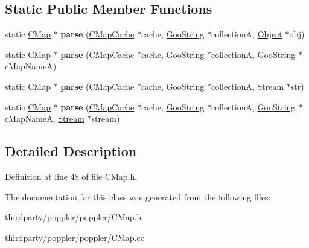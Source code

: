 \subsection*{Static Public Member Functions}
\begin{DoxyCompactItemize}
\item 
\mbox{\label{class_c_map_ab5c82634e14c98587fd3818e840735da}} 
static \hyperlink{class_c_map}{C\+Map} $\ast$ {\bfseries parse} (\hyperlink{class_c_map_cache}{C\+Map\+Cache} $\ast$cache, \hyperlink{class_goo_string}{Goo\+String} $\ast$collectionA, \hyperlink{class_object}{Object} $\ast$obj)
\item 
\mbox{\label{class_c_map_ac7fceeff37c2f559276bc9d5ce3ad06d}} 
static \hyperlink{class_c_map}{C\+Map} $\ast$ {\bfseries parse} (\hyperlink{class_c_map_cache}{C\+Map\+Cache} $\ast$cache, \hyperlink{class_goo_string}{Goo\+String} $\ast$collectionA, \hyperlink{class_goo_string}{Goo\+String} $\ast$c\+Map\+NameA)
\item 
\mbox{\label{class_c_map_ae95c49b2616ccbb821b1e48803356a6d}} 
static \hyperlink{class_c_map}{C\+Map} $\ast$ {\bfseries parse} (\hyperlink{class_c_map_cache}{C\+Map\+Cache} $\ast$cache, \hyperlink{class_goo_string}{Goo\+String} $\ast$collectionA, \hyperlink{class_stream}{Stream} $\ast$str)
\item 
\mbox{\label{class_c_map_aa4c7fd71105b7fd794bab0a26b32e082}} 
static \hyperlink{class_c_map}{C\+Map} $\ast$ {\bfseries parse} (\hyperlink{class_c_map_cache}{C\+Map\+Cache} $\ast$cache, \hyperlink{class_goo_string}{Goo\+String} $\ast$collectionA, \hyperlink{class_goo_string}{Goo\+String} $\ast$c\+Map\+NameA, \hyperlink{class_stream}{Stream} $\ast$stream)
\end{DoxyCompactItemize}


\subsection{Detailed Description}


Definition at line 48 of file C\+Map.\+h.



The documentation for this class was generated from the following files\+:\begin{DoxyCompactItemize}
\item 
thirdparty/poppler/poppler/C\+Map.\+h\item 
thirdparty/poppler/poppler/C\+Map.\+cc\end{DoxyCompactItemize}
